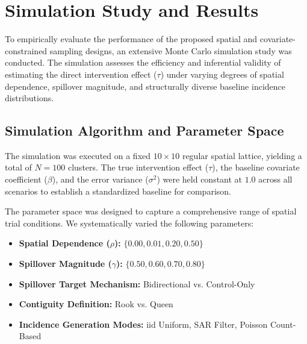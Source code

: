 \documentclass[11pt]{article}
\begin{document}
\setcounter{section}{2} %

\section{Simulation Study and Results}

To empirically evaluate the performance of the proposed spatial and covariate-constrained sampling designs, an extensive Monte Carlo simulation study was conducted. The simulation assesses the efficiency and inferential validity of estimating the direct intervention effect ($\tau$) under varying degrees of spatial dependence, spillover magnitude, and structurally diverse baseline incidence distributions.

\subsection{Simulation Algorithm and Parameter Space}

The simulation was executed on a fixed $10 \times 10$ regular spatial lattice, yielding a total of $N = 100$ clusters. The true intervention effect ($\tau$), the baseline covariate coefficient ($\beta$), and the error variance ($\sigma^2$) were held constant at $1.0$ across all scenarios to establish a standardized baseline for comparison.

The parameter space was designed to capture a comprehensive range of spatial trial conditions. We systematically varied the following parameters:
\begin{itemize}
    \item \textbf{Spatial Dependence ($\rho$):} $\{0.00, 0.01, 0.20, 0.50\}$
    \item \textbf{Spillover Magnitude ($\gamma$):} $\{0.50, 0.60, 0.70, 0.80\}$
    \item \textbf{Spillover Target Mechanism:} Bidirectional vs. Control-Only
    \item \textbf{Contiguity Definition:} Rook vs. Queen
    \item \textbf{Incidence Generation Modes:} iid Uniform, SAR Filter, Poisson Count-Based
\end{itemize}
\end{document}
